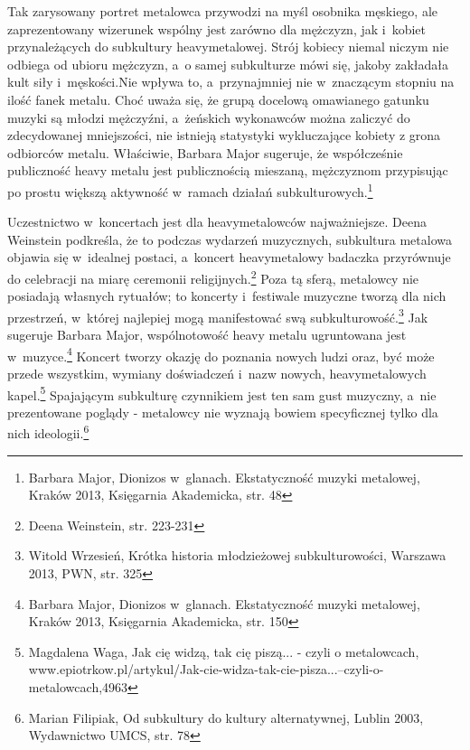 \documentclass[12pt, a4paper, titlepage]{report}
\begin{document}
Tak zarysowany portret metalowca przywodzi na myśl osobnika męskiego,  ale zaprezentowany wizerunek wspólny jest zarówno dla mężczyzn, jak i~kobiet przynależących do subkultury heavymetalowej. Strój kobiecy niemal niczym nie odbiega od ubioru mężczyzn, a~o samej subkulturze mówi się, jakoby zakładała kult siły i~męskości.\footnotemark[\value{footnote}] Nie wpływa to, a~przynajmniej nie w~znaczącym stopniu na ilość fanek metalu. Choć uważa się, że grupą docelową omawianego gatunku muzyki są młodzi mężczyźni, a~żeńskich wykonawców można zaliczyć do zdecydowanej mniejszości, nie istnieją statystyki wykluczające kobiety z grona odbiorców metalu. Właściwie, Barbara Major sugeruje, że współcześnie publiczność heavy metalu jest publicznością mieszaną, mężczyznom przypisując po prostu większą aktywność w~ramach działań subkulturowych.\footnote{Barbara Major, Dionizos w~glanach. Ekstatyczność muzyki metalowej, Kraków 2013, Księgarnia Akademicka, str. 48} 


Uczestnictwo w~koncertach jest dla heavymetalowców najważniejsze. Deena Weinstein podkreśla, że to podczas wydarzeń muzycznych, subkultura metalowa objawia się w~idealnej postaci, a~koncert heavymetalowy badaczka przyrównuje do celebracji na miarę ceremonii religijnych.\footnote{Deena Weinstein, str. 223-231} Poza tą sferą, metalowcy nie posiadają własnych rytuałów; to koncerty i~festiwale muzyczne tworzą dla nich przestrzeń, w~której najlepiej mogą manifestować swą subkulturowość.\footnote{Witold Wrzesień, Krótka historia młodzieżowej subkulturowości, Warszawa 2013, PWN, \break str. 325} Jak sugeruje Barbara Major, wspólnotowość heavy metalu ugruntowana jest w~muzyce.\footnote{Barbara Major, Dionizos w~glanach. Ekstatyczność muzyki metalowej, Kraków 2013, Księgarnia Akademicka, str. 150} Koncert tworzy okazję do poznania nowych ludzi oraz, być może przede wszystkim, wymiany doświadczeń i~nazw nowych, heavymetalowych kapel.\footnote{Magdalena Waga, Jak cię widzą, tak cię piszą... - czyli o metalowcach, www.epiotrkow.pl\break /artykul/Jak-cie-widza-tak-cie-pisza...--czyli-o-metalowcach,4963} Spajającym subkulturę czynnikiem jest ten sam gust muzyczny, a~nie prezentowane poglądy - metalowcy nie wyznają bowiem specyficznej tylko dla nich ideologii.\footnote{Marian Filipiak, Od subkultury do kultury alternatywnej, Lublin 2003, Wydawnictwo UMCS, str. 78}
\end{document}

